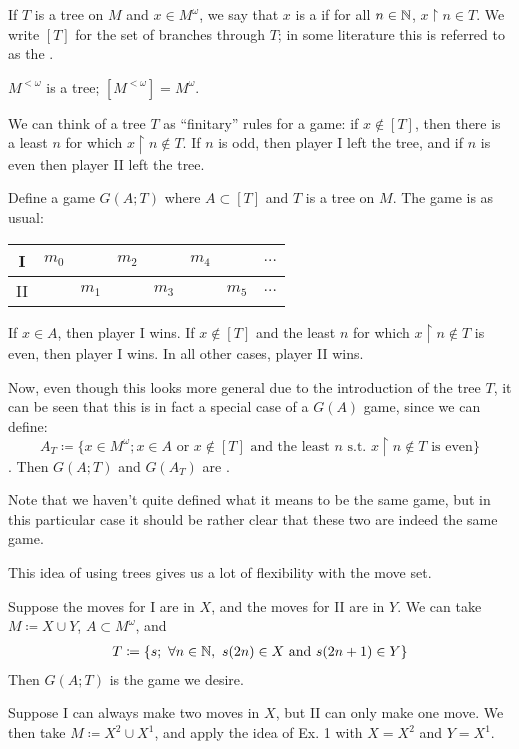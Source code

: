 \documentclass[]{article}
\newcommand{\om}{\omega}
\newcommand{\lom}{{<\omega}}
\newcommand{\game}{
    \begin{center}
        \begin{tabular}{c|ccccccc}
            I & $m_0$ & & $m_2$ & & $m_4 $& & $\dots $\\ \hline
            II & & $m_1$ & & $m_3 $& &$ m_5$ & $\dots$ 
        \end{tabular}
    \end{center}
}
\begin{document}
If $T$ is a tree on $M$ and $x\in M^\om$, we say that $x$ is a  if for all $n \in \mathbb{N}$, $x\restriction n \in T$. We write $[T]$ for the set of branches through $T$; in some literature this is referred to as the .

\begin{remark}[Example]
    $M^\lom$ is a tree; $[M^\lom] = M^\om$.
\end{remark}

We can think of a tree $T$ as ``finitary'' rules for a game: if $x\not\in [T]$, then there is a least $n$ for which $x\restriction n\not\in T$. If $n$ is odd, then player I left the tree, and if $n$ is even then player II left the tree.

Define a game $G(A;T)$ where $A\subset [T]$ and $T$ is a tree on $M$.
The game is as usual:
\game
If $x \in A$, then player I wins. If $x\not\in [T]$ and the least $n$ for which $x\restriction n\not\in T$ is even, then player I wins. In all other cases, player II wins.

Now, even though this looks more general due to the introduction of the tree $T$, it can be seen that this is in fact a special case of a $G(A)$ game, since we can define: $$A_T \coloneqq \{x \in M^\om; x\in A\textrm{ or }x\not\in [T]\textrm{ and the least }n\textrm{ s.t. } x\restriction n\not\in T\textrm{ is even}\}$$. Then $G(A;T)$ and $G(A_T)$ are .

Note that we haven't quite defined what it means to be the same game, but in this particular case it should be rather clear that these two are indeed the same game.

This idea of using trees gives us a lot of flexibility with the move set.

\begin{remark}[Example 1]
    Suppose the moves for I are in $X$, and the moves for II are in $Y$. We can take $M\coloneqq X\cup Y$, $A\subset M^\om$, and
    \begin{align*}
        T\coloneqq \{s;\ \forall n\in \mathbb{N},\ s(2n)\in X\textrm{ and }s(2n+1)\in Y\}
    \end{align*}
    Then $G(A;T)$ is the game we desire.
\end{remark}

\begin{remark}[Example 2]
    Suppose I can always make two moves in $X$, but II can only make one move. We then take $M\coloneqq X^2\cup X^1$, and apply the idea of Ex. 1 with $X = X^2$ and $Y = X^1$.
\end{remark}
\end{document}
